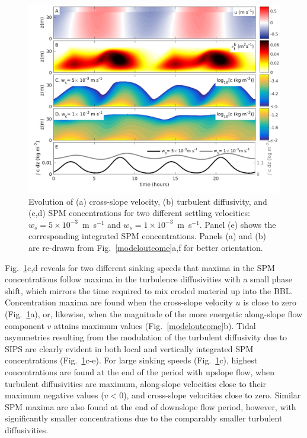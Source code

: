 \begin{figure}
  \noindent\includegraphics[width=40pc]{divc.png}
  \caption{Evolution of (a) cross-slope velocity, (b) turbulent
    diffusivity, and (c,d) SPM concentrations for two different
    settling velocities: $w_s=5 \times 10^{-3}$~m~s$^{-1}$ and $w_s=1
    \times 10^{-3}$~m~s$^{-1}$. Panel (e) shows the corresponding
    integrated SPM concentrations. Panels (a) and (b) are re-drawn
    from Fig.\ \ref{modeloutcome}a,f for better orientation.}
  \label{wsdifference}
\end{figure}

Fig.\ \ref{wsdifference}c,d reveals for two different sinking speeds
that maxima in the SPM concentrations follow maxima in the turbulence
diffusivities with a small phase shift, which mirrors the time
required to mix eroded material up into the BBL. Concentration maxima
are found when the cross-slope velocity $u$ is close to zero
(Fig.\ \ref{wsdifference}a), or, likewise, when the magnitude of the
more energetic along-slope flow component $v$ attains maximum values
(Fig.\ \ref{modeloutcome}b). Tidal asymmetries resulting from the
modulation of the turbulent diffusivity due to SIPS are clearly
evident in both local and vertically integrated SPM concentrations
(Fig.\ \ref{wsdifference}c-e). For large sinking speeds
(Fig.\ \ref{wsdifference}c), highest concentrations are found at the
end of the period with upslope flow, when turbulent diffusivities are
maximum, along-slope velocities close to their maximum negative values
($v<0$), and cross-slope velocities close to zero. Similar SPM maxima
are also found at the end of downslope flow period, however, with
significantly smaller concentrations due to the comparably smaller
turbulent diffusivities.

